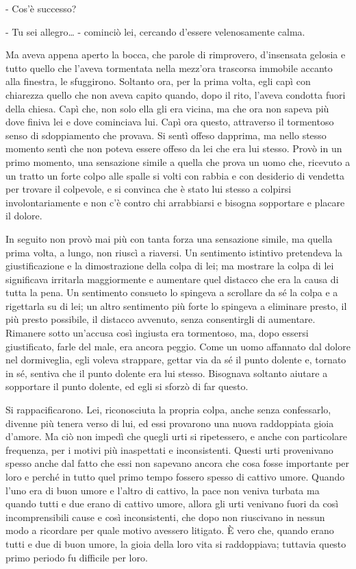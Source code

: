 - Cos'è successo? 

- Tu sei allegro\ldots{} - cominciò lei, cercando d'essere velenosamente calma. 

Ma aveva appena aperto la bocca, che parole di rimprovero, d'insensata gelosia e tutto quello che l'aveva tormentata nella mezz'ora trascorsa immobile accanto alla finestra, le sfuggirono. Soltanto ora, per la prima volta, egli capì con chiarezza quello che non aveva capito quando, dopo il rito, l'aveva condotta fuori della chiesa. Capì che, non solo ella gli era vicina, ma che ora non sapeva più dove finiva lei e dove cominciava lui. Capì ora questo, attraverso il tormentoso senso di sdoppiamento che provava. Si sentì offeso dapprima, ma nello stesso momento sentì che non poteva essere offeso da lei che era lui stesso. Provò in un primo momento, una sensazione simile a quella che prova un uomo che, ricevuto a un tratto un forte colpo alle spalle si volti con rabbia e con desiderio di vendetta per trovare il colpevole, e si convinca che è stato lui stesso a colpirsi involontariamente e non c'è contro chi arrabbiarsi e bisogna sopportare e placare il dolore. 

In seguito non provò mai più con tanta forza una sensazione simile, ma quella prima volta, a lungo, non riuscì a riaversi. Un sentimento istintivo pretendeva la giustificazione e la dimostrazione della colpa di lei; ma mostrare la colpa di lei significava irritarla maggiormente e aumentare quel distacco che era la causa di tutta la pena. Un sentimento consueto lo spingeva a scrollare da sé la colpa e a rigettarla su di lei; un altro sentimento più forte lo spingeva a eliminare presto, il più presto possibile, il distacco avvenuto, senza consentirgli di aumentare. Rimanere sotto un'accusa così ingiusta era tormentoso, ma, dopo essersi giustificato, farle del male, era ancora peggio. Come un uomo affannato dal dolore nel dormiveglia, egli voleva strappare, gettar via da sé il punto dolente e, tornato in sé, sentiva che il punto dolente era lui stesso. Bisognava soltanto aiutare a sopportare il punto dolente, ed egli si sforzò di far questo. 

Si rappacificarono. Lei, riconosciuta la propria colpa, anche senza confessarlo, divenne più tenera verso di lui, ed essi provarono una nuova raddoppiata gioia d'amore. Ma ciò non impedì che quegli urti si ripetessero, e anche con particolare frequenza, per i motivi più inaspettati e inconsistenti. Questi urti provenivano spesso anche dal fatto che essi non sapevano ancora che cosa fosse importante per loro e perché in tutto quel primo tempo fossero spesso di cattivo umore. Quando l'uno era di buon umore e l'altro di cattivo, la pace non veniva turbata ma quando tutti e due erano di cattivo umore, allora gli urti venivano fuori da così incomprensibili cause e così inconsistenti, che dopo non riuscivano in nessun modo a ricordare per quale motivo avessero litigato. È vero che, quando erano tutti e due di buon umore, la gioia della loro vita si raddoppiava; tuttavia questo primo periodo fu difficile per loro. 

